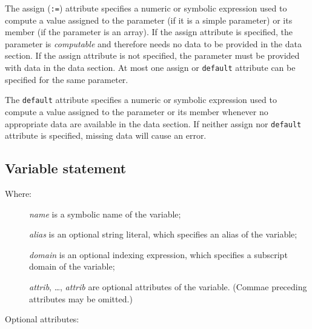 \documentclass[10pt]{article}
\begin{document}
The assign ({\tt:=}) attribute specifies a numeric or symbolic
expression used to compute a value assigned to the parameter (if it is
a simple parameter) or its member (if the parameter is an array). If
the assign attribute is specified, the parameter is {\it computable}
and therefore needs no data to be provided in the data section. If the
assign attribute is not specified, the parameter must be provided with
data in the data section. At most one assign or {\tt default} attribute
can be specified for the same parameter.

The {\tt default} attribute specifies a numeric or symbolic expression
used to compute a value assigned to the parameter or its member
whenever no appropriate data are available in the data section. If
neither assign nor {\tt default} attribute is specified, missing data
will cause an error.

\subsection{Variable statement}

\medskip


\setlength{\leftmargini}{60pt}

\begin{description}
\item[{\rm Where:}\hspace*{23pt}] {\it name} is a symbolic name of the
variable;
\item[\hspace*{54pt}] {\it alias} is an optional string literal, which
specifies an alias of the variable;
\item[\hspace*{54pt}] {\it domain} is an optional indexing expression,
which specifies a subscript domain of the variable;
\item[\hspace*{54pt}] {\it attrib}, \dots, {\it attrib} are optional
attributes of the variable. (Commae preceding attributes may be
omitted.)
\end{description}

\noindent Optional attributes:
\end{document}
